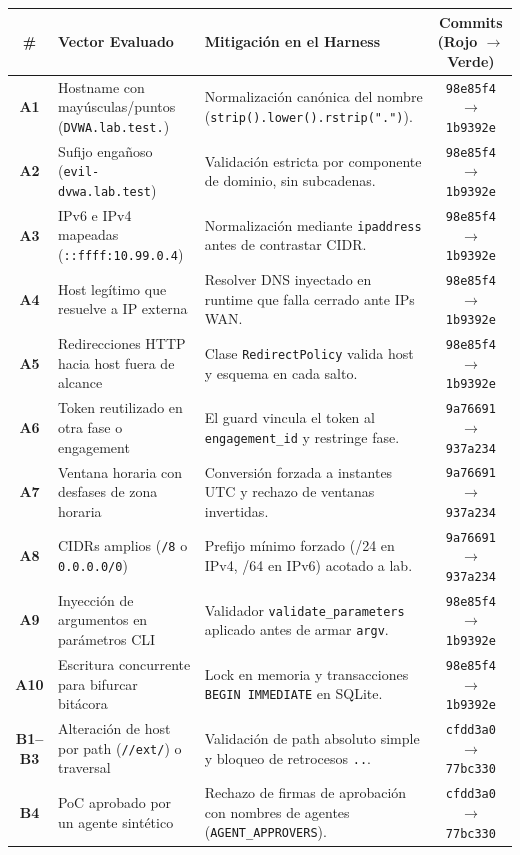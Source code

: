 \documentclass[10pt,a4paper]{article}
\begin{document}
\begin{table}[H]
\centering
\footnotesize
\begin{tabularx}{\linewidth}{c p{5cm} X c}
\toprule
\textbf{\#} & \textbf{Vector Evaluado} & \textbf{Mitigación en el Harness} & \textbf{Commits (Rojo $\rightarrow$ Verde)} \\
\midrule
\textbf{A1} & Hostname con mayúsculas/puntos (\texttt{DVWA.lab.test.}) & Normalización canónica del nombre (\texttt{strip().lower().rstrip(".")}). & \texttt{98e85f4} $\rightarrow$ \texttt{1b9392e} \\
\textbf{A2} & Sufijo engañoso (\texttt{evil-dvwa.lab.test}) & Validación estricta por componente de dominio, sin subcadenas. & \texttt{98e85f4} $\rightarrow$ \texttt{1b9392e} \\
\textbf{A3} & IPv6 e IPv4 mapeadas (\texttt{::ffff:10.99.0.4}) & Normalización mediante \texttt{ipaddress} antes de contrastar CIDR. & \texttt{98e85f4} $\rightarrow$ \texttt{1b9392e} \\
\textbf{A4} & Host legítimo que resuelve a IP externa & Resolver DNS inyectado en runtime que falla cerrado ante IPs WAN. & \texttt{98e85f4} $\rightarrow$ \texttt{1b9392e} \\
\textbf{A5} & Redirecciones HTTP hacia host fuera de alcance & Clase \texttt{RedirectPolicy} valida host y esquema en cada salto. & \texttt{98e85f4} $\rightarrow$ \texttt{1b9392e} \\
\textbf{A6} & Token reutilizado en otra fase o engagement & El guard vincula el token al \texttt{engagement\_id} y restringe fase. & \texttt{9a76691} $\rightarrow$ \texttt{937a234} \\
\textbf{A7} & Ventana horaria con desfases de zona horaria & Conversión forzada a instantes UTC y rechazo de ventanas invertidas. & \texttt{9a76691} $\rightarrow$ \texttt{937a234} \\
\textbf{A8} & CIDRs amplios (\texttt{/8} o \texttt{0.0.0.0/0}) & Prefijo mínimo forzado (/24 en IPv4, /64 en IPv6) acotado a lab. & \texttt{9a76691} $\rightarrow$ \texttt{937a234} \\
\textbf{A9} & Inyección de argumentos en parámetros CLI & Validador \texttt{validate\_parameters} aplicado antes de armar \texttt{argv}. & \texttt{98e85f4} $\rightarrow$ \texttt{1b9392e} \\
\textbf{A10} & Escritura concurrente para bifurcar bitácora & Lock en memoria y transacciones \texttt{BEGIN IMMEDIATE} en SQLite. & \texttt{98e85f4} $\rightarrow$ \texttt{1b9392e} \\
\textbf{B1--B3} & Alteración de host por path (\texttt{//ext/}) o traversal & Validación de path absoluto simple y bloqueo de retrocesos \texttt{..}. & \texttt{cfdd3a0} $\rightarrow$ \texttt{77bc330} \\
\textbf{B4} & PoC aprobado por un agente sintético & Rechazo de firmas de aprobación con nombres de agentes (\texttt{AGENT\_APPROVERS}). & \texttt{cfdd3a0} $\rightarrow$ \texttt{77bc330} \\
\bottomrule
\end{tabularx}
\end{table}
\end{document}
